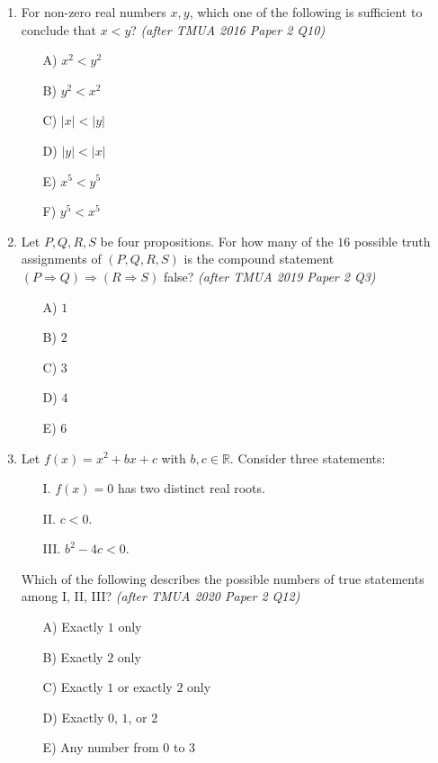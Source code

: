 \documentclass[11pt,a4paper]{article}
\begin{document}
\begin{enumerate}

\item For non-zero real numbers $x,y$, which one of the following is sufficient to conclude that $x<y$? \textit{\small(after TMUA 2016 Paper 2 Q10)}
\begin{itemize}
\item[A)] $x^2<y^2$
\item[B)] $y^2<x^2$
\item[C)] $|x|<|y|$
\item[D)] $|y|<|x|$
\item[E)] $x^5<y^5$
\item[F)] $y^5<x^5$
\end{itemize}

\item Let $P, Q, R, S$ be four propositions. For how many of the $16$ possible truth assignments of $(P, Q, R, S)$ is the compound statement $(P \Rightarrow Q) \Rightarrow (R \Rightarrow S)$ false? \textit{\small(after TMUA 2019 Paper 2 Q3)}
\begin{itemize}
\item[A)] $1$
\item[B)] $2$
\item[C)] $3$
\item[D)] $4$
\item[E)] $6$
\end{itemize}

\item Let $f(x) = x^2 + bx + c$ with $b, c \in \mathbb{R}$. Consider three statements:
\begin{itemize}
\item[I.] $f(x) = 0$ has two distinct real roots.
\item[II.] $c < 0$.
\item[III.] $b^2 - 4c < 0$.
\end{itemize}
Which of the following describes the possible numbers of true statements among I, II, III? \textit{\small(after TMUA 2020 Paper 2 Q12)}
\begin{itemize}
\item[A)] Exactly $1$ only
\item[B)] Exactly $2$ only
\item[C)] Exactly $1$ or exactly $2$ only
\item[D)] Exactly $0$, $1$, or $2$
\item[E)] Any number from $0$ to $3$
\end{itemize}


\end{enumerate}
\end{document}

